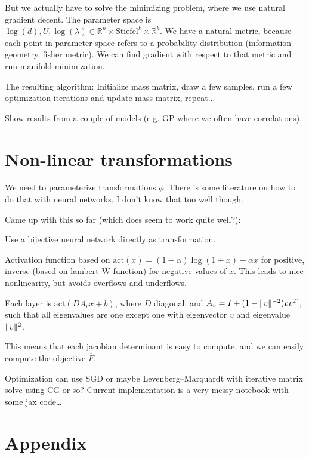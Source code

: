 \documentclass{scrartcl}
\DeclarePairedDelimiter{\norm}{\lVert}{\rVert}
\begin{document}
But we actually have to solve the minimizing problem, where we use natural
gradient decent. The parameter space is $\log(d), U, \log(\lambda) \in \mathbb{R}^n
\times \text{Stiefel}^k \times \mathbb{R}^k$. We have a natural metric, because each
point in parameter space refers to a probability distribution (information
geometry, fisher metric). We can find gradient with respect to that metric and
run manifold minimization.

The resulting algorithm: Initialize mass matrix, draw a few samples, run a few
optimization iterations and update mass matrix, repeat...

Show results from a couple of models (e.g. GP where we often have correlations).

\section{Non-linear transformations}

We need to parameterize transformations $\phi$. There is some literature on
how to do that with neural networks, I don't know that too well though.

Came up with this so far (which does seem to work quite well?):

Use a bijective neural network directly as transformation.

Activation function based on $\text{act}(x) = (1 - α)\log(1 + x) + αx$ for positive, inverse
(based on lambert W function) for negative values of $x$. This leads to nice
nonlinearity, but avoids overflows and underflows.

Each layer is $\text{act}(DA_vx + b)$, where $D$ diagonal, and $A_v = I
+ (1 - \norm{v}^{-2})vv^T$, such that all eigenvalues are one
except one with eigenvector $v$ and eigenvalue $\norm{v}^2$.

This means that each jacobian determinant is easy to compute, and we can easily
compute the objective $\hat F$.

Optimization can use SGD or maybe Levenberg–Marquardt with iterative matrix
solve using CG or so? Current implementation is a very messy notebook with some
jax code\dots

\section*{Appendix}
\end{document}
